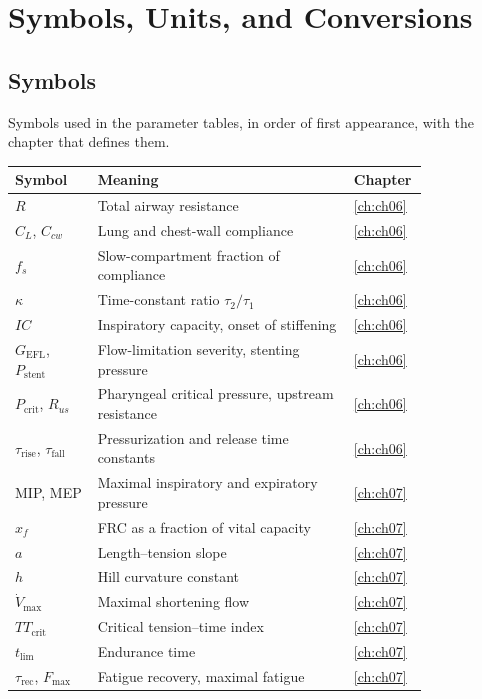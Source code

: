 \chapter{Symbols, Units, and Conversions}
\label{app:appA}

\section{Symbols}
Symbols used in the parameter tables, in order of first appearance, with the chapter that defines them.

{\small\begin{longtable}{@{}p{0.2\linewidth} p{0.62\linewidth} l@{}}
\toprule
Symbol & Meaning & Chapter \\
\midrule\endhead
\bottomrule\endfoot
$R$ & Total airway resistance & \cref{ch:ch06} \\
$C_L$, $C_{cw}$ & Lung and chest-wall compliance & \cref{ch:ch06} \\
$f_s$ & Slow-compartment fraction of compliance & \cref{ch:ch06} \\
$\kappa$ & Time-constant ratio $\tau_2/\tau_1$ & \cref{ch:ch06} \\
$IC$ & Inspiratory capacity, onset of stiffening & \cref{ch:ch06} \\
$G_{\mathrm{EFL}}$, $P_{\mathrm{stent}}$ & Flow-limitation severity, stenting pressure & \cref{ch:ch06} \\
$P_{\mathrm{crit}}$, $R_{us}$ & Pharyngeal critical pressure, upstream resistance & \cref{ch:ch06} \\
$\tau_{\mathrm{rise}}$, $\tau_{\mathrm{fall}}$ & Pressurization and release time constants & \cref{ch:ch06} \\
MIP, MEP & Maximal inspiratory and expiratory pressure & \cref{ch:ch07} \\
$x_f$ & FRC as a fraction of vital capacity & \cref{ch:ch07} \\
$a$ & Length--tension slope & \cref{ch:ch07} \\
$h$ & Hill curvature constant & \cref{ch:ch07} \\
$\dot V_{\max}$ & Maximal shortening flow & \cref{ch:ch07} \\
$TT_{\mathrm{crit}}$ & Critical tension--time index & \cref{ch:ch07} \\
$t_{\lim}$ & Endurance time & \cref{ch:ch07} \\
$\tau_{\mathrm{rec}}$, $F_{\max}$ & Fatigue recovery, maximal fatigue & \cref{ch:ch07} \\

\end{longtable}}
